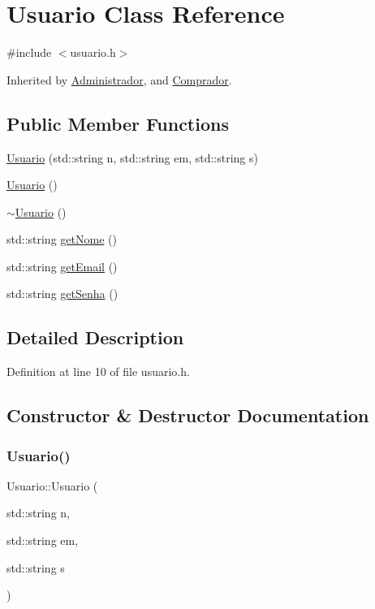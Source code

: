 \hypertarget{class_usuario}{}\section{Usuario Class Reference}
\label{class_usuario}


{\ttfamily \#include $<$usuario.\+h$>$}



Inherited by \hyperlink{class_administrador}{Administrador}, and \hyperlink{class_comprador}{Comprador}.

\subsection*{Public Member Functions}
\begin{DoxyCompactItemize}
\item 
\hyperlink{class_usuario_a97a2a962954d1b55a496d2cdf56863e4}{Usuario} (std\+::string n, std\+::string em, std\+::string s)
\item 
\hyperlink{class_usuario_aa85a5371a098dfba5449140d9b8a472f}{Usuario} ()
\item 
\hyperlink{class_usuario_ab4096b0b8300ecb47b10c555fb09c997}{$\sim$\+Usuario} ()
\item 
std\+::string \hyperlink{class_usuario_a9fd39b37a8f38cfd990aba2234de9ea0}{get\+Nome} ()
\item 
std\+::string \hyperlink{class_usuario_ab47f811619c0f6e26d43f11393f2b143}{get\+Email} ()
\item 
std\+::string \hyperlink{class_usuario_afe5b8e2b50dcf24b109357fda3716f7f}{get\+Senha} ()
\end{DoxyCompactItemize}


\subsection{Detailed Description}


Definition at line 10 of file usuario.\+h.



\subsection{Constructor \& Destructor Documentation}
\mbox{\label{class_usuario_a97a2a962954d1b55a496d2cdf56863e4}} 
\subsubsection{\texorpdfstring{Usuario()}{Usuario()}\hspace{0.1cm}{\footnotesize\ttfamily [1/2]}}
{\footnotesize\ttfamily Usuario\+::\+Usuario (\begin{DoxyParamCaption}\item[{std\+::string}]{n,  }\item[{std\+::string}]{em,  }\item[{std\+::string}]{s }\end{DoxyParamCaption})}



